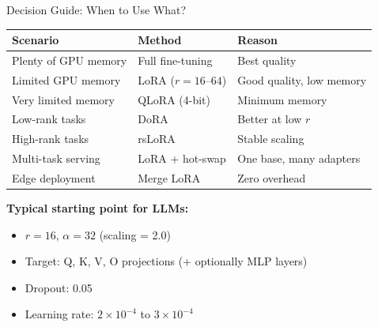 \documentclass[aspectratio=169,10pt]{beamer}
\begin{document}
\begin{frame}{Decision Guide: When to Use What?}
	\begin{table}
		\centering
		\small
		\begin{tabular}{p{3.5cm}p{3.5cm}p{4cm}}
			\toprule
			\textbf{Scenario}    & \textbf{Method}     & \textbf{Reason}          \\
			\midrule
			Plenty of GPU memory & Full fine-tuning    & Best quality             \\
			Limited GPU memory   & LoRA ($r=16$--$64$) & Good quality, low memory \\
			Very limited memory  & QLoRA (4-bit)       & Minimum memory           \\
			Low-rank tasks       & DoRA                & Better at low $r$        \\
			High-rank tasks      & rsLoRA              & Stable scaling           \\
			Multi-task serving   & LoRA + hot-swap     & One base, many adapters  \\
			Edge deployment      & Merge LoRA          & Zero overhead            \\
			\bottomrule
		\end{tabular}
	\end{table}

	\vspace{0.3cm}
	\textbf{Typical starting point for LLMs:}
	\begin{itemize}
		\item $r = 16$, $\alpha = 32$ (scaling = 2.0)
		\item Target: Q, K, V, O projections (+ optionally MLP layers)
		\item Dropout: 0.05
		\item Learning rate: $2 \times 10^{-4}$ to $3 \times 10^{-4}$
	\end{itemize}
\end{frame}
\end{document}
